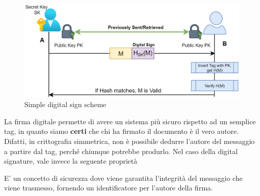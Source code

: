 \begin{figure}[h]
    \centering
    \includegraphics{image/digitalsign.png}
    \caption{Simple digital sign scheme}
    \label{fig:digitalsign}
\end{figure}
La firma digitale permette di avere un sistema più sicuro rispetto ad un semplice tag, in quanto siamo \textbf{certi} che chi ha firmato il documento è il vero autore. Difatti, in crittografia simmetrica, non è possibile dedurre l'autore del messaggio a partire dal tag, perché chiunque potrebbe produrlo. Nel caso della digital signature, vale invece la seguente proprietà
\begin{definition} 
E' un concetto di sicurezza dove viene garantita l'integrità del messaggio che viene trasmesso, fornendo un identificatore per l'autore della firma.
\end{definition}

